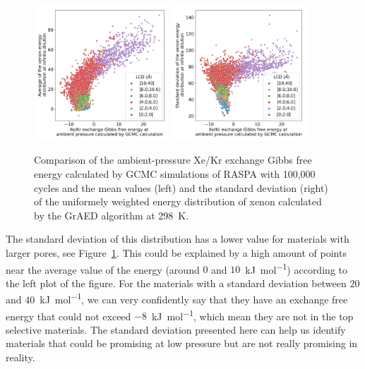 \documentclass[main]{subfiles}
\begin{document}
\begin{figure}[ht]
  \centering
    \includegraphics[width=0.45\textwidth]{figures/3-fastsim/G_2080_vs_mean_grid_x_overview.jpg}
    \includegraphics[width=0.45\textwidth]{figures/3-fastsim/G_2080_vs_std_grid_x_overview.jpg}
    \caption{Comparison of the ambient-pressure Xe/Kr exchange Gibbs free energy calculated by GCMC simulations of RASPA with 100,000 cycles and the mean values (left) and the standard deviation (right) of the uniformely weighted energy distribution of xenon calculated by the GrAED algorithm at \SI{298}{\kelvin}.}\label{fgr:energy_dist_mean_std}
\end{figure}

The standard deviation of this distribution has a lower value for materials with larger pores, see Figure~\ref{fgr:energy_dist_mean_std}. This could be explained by a high amount of points near the average value of the energy (around $0$ and $10$~\si{\kilo\joule\per\mole}) according to the left plot of the figure. For the materials with a standard deviation between $20$ and $40$~\si{\kilo\joule\per\mole}, we can very confidently say that they have an exchange free energy that could not exceed $-8$~\si{\kilo\joule\per\mole}, which mean they are not in the top selective materials. The standard deviation presented here can help us identify materials that could be promising at low pressure but are not really promising in reality. 
\end{document}
